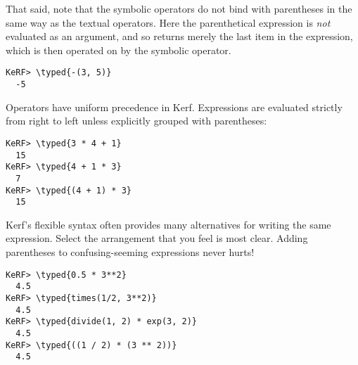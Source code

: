 \documentclass{article}
\newcommand{\typed}[1]{\textcolor{TealBlue}{#1}}
\begin{document}
That said, note that the symbolic operators do not bind with parentheses in the same way as the textual operators. Here the parenthetical expression is \emph{not} evaluated as an argument, and so returns merely the last item in the expression, which is then operated on by the symbolic operator.
\begin{Verbatim}
KeRF> \typed{-(3, 5)}
  -5
\end{Verbatim}

Operators have uniform precedence in Kerf. Expressions are evaluated strictly from right to left unless explicitly grouped with parentheses:
\begin{Verbatim}
KeRF> \typed{3 * 4 + 1}
  15
KeRF> \typed{4 + 1 * 3}
  7
KeRF> \typed{(4 + 1) * 3}
  15
\end{Verbatim}

Kerf's flexible syntax often provides many alternatives for writing the same expression. Select the arrangement that you feel is most clear. Adding parentheses to confusing-seeming expressions never hurts!
\begin{Verbatim}
KeRF> \typed{0.5 * 3**2}
  4.5
KeRF> \typed{times(1/2, 3**2)}
  4.5
KeRF> \typed{divide(1, 2) * exp(3, 2)}
  4.5
KeRF> \typed{((1 / 2) * (3 ** 2))}
  4.5
\end{Verbatim}
\end{document}
